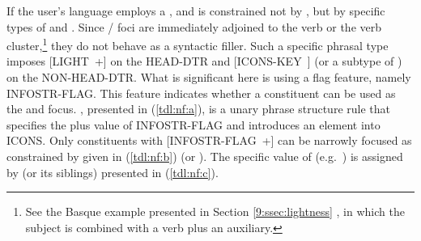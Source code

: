 





If the user's language employs a ,  and
  is constrained not by , but
by specific types of  and
.  Since / foci are
immediately adjoined to the verb or the verb cluster,\footnote{See the
  Basque example presented in Section \ref{9:ssec:lightness}
  , in which the subject is combined
  with a verb plus an auxiliary.} 
  they do not behave as a syntactic filler.
Such a specific phrasal type imposes \mbox{[LIGHT +]} on the
HEAD-DTR and \mbox{[ICONS-KEY ]} (or a subtype of
) on the NON-HEAD-DTR.
What is significant here is using a
flag feature, namely INFOSTR-FLAG.  This feature indicates whether a
constituent can be used as the  and 
focus. , presented in (\ref{tdl:nf:a}), is a
unary phrase structure rule that specifies the plus value of
INFOSTR-FLAG and introduces an element into ICONS. Only constituents
with \mbox{[INFOSTR-FLAG +]} can be narrowly focused as constrained by
 given in (\ref{tdl:nf:b}) (or
). The specific value of 
(e.g.\ ) is assigned by  (or its
siblings) presented in (\ref{tdl:nf:c}).




